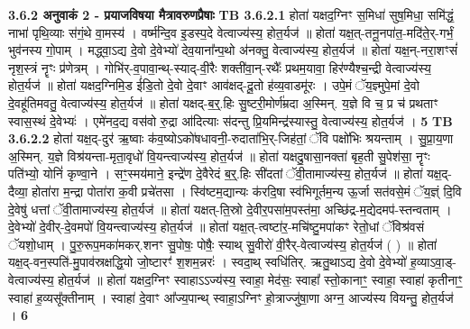 \documentclass[17pt]{extarticle}
\begin{document}
{{{{{{{{{{{{{{{{{{{                \textbf{ 3.6.2     अनुवाकं   2 - प्रयाजविषया मैत्रावरुणप्रैषाः} \newline
                                \textbf{ TB 3.6.2.1} \newline
                  होता॑ यक्षद॒ग्निꣳ स॒मिधा॑ सुष॒मिधा॒ समि॑द्धं॒ नाभा॑ पृथि॒व्याः स॑गं॒थे वा॒मस्य॑ । वर्ष्म॑न्दि॒व इ॒डस्प॒दे वेत्वाज्य॑स्य॒ होत॒र्यज॑ ॥ होता॑ यक्ष॒त्-तनू॒नपा॑त॒-मदि॑ते॒र्-गर्भं॒ भुव॑नस्य गो॒पाम् । मद्ध्वा॒ऽद्य दे॒वो दे॒वेभ्यो॑ देव॒याना᳚न्प॒थो अ॑नक्तु॒ वेत्वाज्य॑स्य॒ होत॒र्यज॑ ॥ होता॑ यक्ष॒न्-नरा॒शꣳसं॑ नृश॒स्त्रं नॄꣳः प्र॑णेत्रम् । गोभि॑र्-व॒पावा॒न्थ्-स्याद्-वी॒रैः शक्ती॑वा॒न्-रथैः᳚ प्रथम॒यावा॒ हिर॑ण्यैश्च॒न्द्री वेत्वाज्य॑स्य॒ होत॒र्यज॑ ॥ होता॑ यक्षद॒ग्निमि॒ड ई॑डि॒तो दे॒वो दे॒वाꣳ आव॑क्षद्-दू॒तो ह॑व्य॒वाडमू॑रः । उपे॒मं ॅय॒ज्ञ्मुपे॒मां दे॒वो दे॒वहू॑तिमवतु॒ वेत्वाज्य॑स्य॒ होत॒र्यज॑ ॥ होता॑ यक्षद्-ब॒र्॒.हिः सु॒ष्टरी॒मोर्ण॑म्रदा अ॒स्मिन्. य॒ज्ञे वि च॒ प्र च॑ प्रथताꣳ स्वास॒स्थं दे॒वेभ्यः॑ । एमे॑नद॒द्य वस॑वो रु॒द्रा आ॑दित्याः स॑दन्तु प्रि॒यमिन्द्र॑स्यास्तु॒ वेत्वाज्य॑स्य॒ होत॒र्यज॑ । \textbf{ 5} \newline
                  \newline
                                \textbf{ TB 3.6.2.2} \newline
                  होता॑ यक्ष॒द्-दुर॑ ऋ॒ष्वाः क॑व॒ष्योऽको॑षधावनी॒-रुदाता॑भि॒र्-जिह॑तां॒ ॅवि पक्षो॑भिः श्रयन्ताम् । सु॒प्रा॒य॒णा अ॒स्मिन्. य॒ज्ञे विश्र॑यन्ता-मृता॒वृधो॑ वि॒यन्त्वाज्य॑स्य॒ होत॒र्यज॑ ॥ होता॑ यक्षदु॒षासा॒नक्ता॑ बृह॒ती सु॒पेश॑सा॒ नॄꣳः पति॑भ्यो॒ योनिं॑ कृण्वा॒ने । सꣳ॒॒स्मय॑माने॒ इन्द्रे॑ण दे॒वैरेदं ब॒र्॒.हिः सी॑दतां ॅवी॒तामाज्य॑स्य॒ होत॒र्यज॑ ॥ होता॑ यक्ष॒द्-दैव्या॒ होता॑रा म॒न्द्रा पोता॑रा क॒वी प्रचे॑तसा । स्वि॑ष्टम॒द्यान्यः क॑रदि॒षा स्व॑भिगूर्तम॒न्य ऊ॒र्जा सत॑वसे॒मं ॅय॒ज्ञ्ं दि॒वि दे॒वेषु॑ धत्तां ॅवी॒तामाज्य॑स्य॒ होत॒र्यज॑ ॥ होता॑ यक्षत्-ति॒स्रो दे॒वीर॒पसा॑म॒पस्त॑मा॒ अच्छि॑द्र-म॒द्येदमप॑-स्तन्वताम् । दे॒वेभ्यो॑ दे॒वीर्-दे॒वमपो॑ वि॒यन्त्वाज्य॑स्य॒ होत॒र्यज॑ ॥ होता॑ यक्ष॒त्-त्वष्टा॑र॒-मचि॑ष्टु॒मपा॑कꣳ रेतो॒धां ॅविश्र॑वसं ॅयशो॒धाम् । पु॒रु॒रूप॒मका॑मकर्.शनꣳ सु॒पोषः॒ पोषैः॒ स्याथ् सु॒वीरो॑ वी॒रैर्-वेत्वाज्य॑स्य॒ होत॒र्यज॑ ( ) ॥ होता॑ यक्ष॒द्-वन॒स्पति॑-मु॒पाव॑स्रक्षद्धि॒यो जो॒ष्टारꣳ॑ श॒शम॒न्नरः॑ । स्वदा॒थ् स्वधि॑तिर्. ऋतु॒थाऽद्य दे॒वो दे॒वेभ्यो॑ ह॒व्याऽवा॒ड्-वेत्वाज्य॑स्य॒ होत॒र्यज॑ ॥ होता॑ यक्षद॒ग्निꣳ स्वाहाऽऽज्य॑स्य॒ स्वाहा॒ मेद॑सः॒ स्वाहा᳚ स्तो॒कानाꣳ॒॒ स्वाहा॒ स्वाहा॑ कृतीनाꣳ॒॒ स्वाहा॑ ह॒व्यसू᳚क्तीनाम् । स्वाहा॑ दे॒वाꣳ आ᳚ज्य॒पान्थ् स्वाहा॒ऽग्निꣳ हो॒त्राज्जु॑षा॒णा अग्न॒ आज्य॑स्य वियन्तु॒ होत॒र्यज॑ । \textbf{ 6} \newline
                  \newline
}}}}}}}}}}}}}}}}}}}
\end{document}
